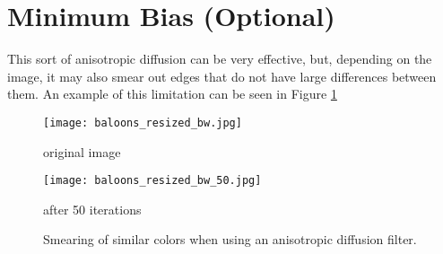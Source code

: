 \section*{Minimum Bias (Optional)}

This sort of anisotropic diffusion can be very effective, but, depending on the image, it may also smear out edges that do not have large differences between them.
An example of this limitation can be seen in Figure \ref{fig:anisdif_smearing}

\begin{figure}
\begin{minipage}[b]{.45\linewidth}
\centering
\texttt{[image: baloons\_resized\_bw.jpg]}
\caption*{original image}
\end{minipage}
\hspace{0.5cm}
\begin{minipage}[b]{0.45\linewidth}
\centering
\texttt{[image: baloons\_resized\_bw\_50.jpg]}
\caption*{after 50 iterations}
\end{minipage}
\caption{Smearing of similar colors when using an anisotropic diffusion filter.}
\label{fig:anisdif_smearing}
\end{figure}

